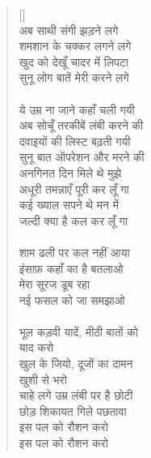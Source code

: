 \begin{verse}[\versewidth]
{\\
अब साथी संगी झड़ने लगे\\
शमशान के चक्कर लगने लगे\\
खुद को देखूँ चादर में लिपटा\\
सुनू लोग बातें मेरी करने लगे\\
\\
ये उम्र ना जाने कहाँ चली गयी\\
अब सोचूँ तरकीबें लंबी करने की\\
दवाइयों की लिस्ट बढ़ती गयी\\
सुनू बात ऑपरेशन और मरने की\\
अनगिनत दिन मिले थे मुझे\\
अधूरी तमन्नाएँ पूरी कर लूँ गा\\
कई ख्याल सपने थे मन में\\
जल्दी क्या है कल कर लूँ गा\\
\\
शाम ढली पर कल नहीं आया\\
इंसाफ़ कहाँ का है बतलाओ\\
मेरा सूरज डूब रहा\\
नई फसल को जा समझाओ\\
\\
भूल कड़वी यादें, मीठी बातों को\\
याद करो\\
खुल के जियो, दूजों का दामन\\
खुशी से भरो\\
चाहे लगे उम्र लंबी पर है छोटी\\
छोड़ शिकायत गिले पछतावा\\
इस पल को रौशन करो\\
इस पल को रौशन करो
}\end{verse}

